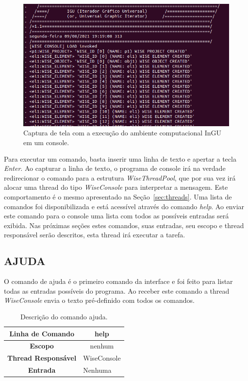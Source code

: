 \begin{figure}[!htbp]
	\centering
	\includegraphics[scale=0.45]{Figures/InGU_console.png}
	\caption{Captura de tela com a execução do ambiente computacional InGU em um console.}
	\label{fig11:ajuda}
\end{figure}

Para executar um comando, basta inserir uma linha de texto e apertar a tecla \textit{Enter}.  Ao capturar a linha de texto, o programa de console irá na verdade redirecionar o comando para a estrutura \textit{WiseThreadPool}, que por sua vez irá alocar uma thread do tipo \textit{WiseConsole} para interpretar a mensagem. Este comportamento é o mesmo apresentado na Seção~\ref{sec:threads}. Uma lista de comandos foi disponibilizada e está acessível através do comando \textit{help}. Ao enviar este comando para o console uma lista com todos as possíveis entradas será exibida. Nas próximas seções estes comandos, suas entradas, seu escopo e thread responsável serão descritos, esta thread irá executar a tarefa. 

\subsection{AJUDA}\label{sec:help}

O comando de ajuda é o primeiro comando da interface e foi feito para listar todas as entradas possíveis do programa. Ao receber este comando a thread \textit{WiseConsole} envia o texto pré-definido com todos os comandos.

\begin{center}
	\begin{table}[!htbp]
		\begin{tabular}{|c|m{}|}
			\hline
			\textbf{Linha de Comando} & \multicolumn{1}{c|}{help} \\
			\hline
			\textbf{Escopo} & \multicolumn{1}{c|}{nenhum} \\
			\hline
			\textbf{Thread Responsável} & \multicolumn{1}{c|}{WiseConsole} \\
			\hline
			\textbf{Entrada} & Nenhuma \\
			\hline
		\end{tabular}
		\caption{Descrição do comando ajuda.}
		\label{tab:help}
	\end{table}
\end{center}

